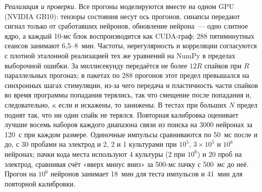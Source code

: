 \documentclass[pre,twocolumn,superscriptaddress,showpacs=false,amsmath,amssymb,nofootinbib]{revtex4-2}
\begin{document}
\emph{Реализация и проверки.} Все прогоны моделируются вместе на одном GPU (NVIDIA GB10): тензоры состояния несут ось прогонов, синапсы передают сигнал только от сработавших нейронов, обновление нейрона~--- одно слитное ядро, а каждый 10-мс блок воспроизводится как CUDA-граф; 288 пятиминутных сеансов занимают 6{,}5--8~мин. Частоты, нерегулярность и корреляции согласуются с плотной эталонной реализацией тех же уравнений на NumPy в пределах выборочной ошибки. За миллисекунду передаётся не более $12R$ спайков при $R$ параллельных прогонах; в пакетах по 288 прогонов этот предел превышался на синхронных шагах стимуляции, из-за чего передача и пластичность части спайков во время программы попадания терялись, так что смещение после попадания и, следовательно, $\kappa$ если и искажены, то занижены. В тестах при больших $N$ предел поднят так, что ни один спайк не терялся. Повторная калибровка оценивает лучшие восемь наборов каждого диапазона связи из поиска на 3000 нейронах за 120~с при каждом размере. Одиночные импульсы сравниваются по 50~мс после и до, с 30 пробами на электрод и 2, 2 и 1 культурами при $10^5$, $3\times10^5$ и $10^6$ нейронах; пачки кода места используют 4 культуры (2 при $10^6$) и 20 проб на электрод, сравнивая счёт «вверх минус вниз» за 500-мс пачку с 500~мс до неё. Прогон на $10^6$ нейронов занимает 18~мин для теста импульсов и 41~мин для повторной калибровки.


\end{document}
